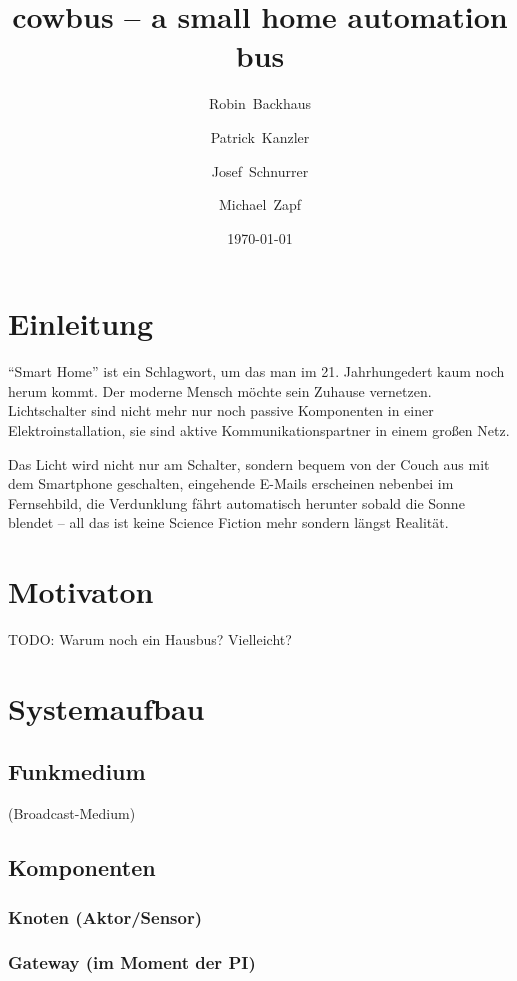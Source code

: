 \documentclass{IEEEtran}
\begin{document}
\title{cowbus -- a small home automation bus}
\author{Robin~Backhaus \and Patrick~Kanzler \and Josef~Schnurrer \and Michael~Zapf}
\date{\today}



\maketitle

\begin{abstract}
\end{abstract}


\section{Einleitung}
\enquote{Smart Home} ist ein Schlagwort, um das man im 21. Jahrhungedert
kaum noch herum kommt. Der moderne Mensch möchte sein Zuhause vernetzen.
Lichtschalter sind nicht mehr nur noch passive Komponenten in einer
Elektroinstallation, sie sind aktive Kommunikationspartner in einem großen Netz.

Das Licht wird nicht nur am Schalter, sondern bequem von der Couch aus mit dem
Smartphone geschalten, eingehende E-Mails erscheinen nebenbei im Fernsehbild,
die Verdunklung fährt automatisch herunter sobald die Sonne blendet --
all das ist keine Science Fiction mehr sondern längst Realität.

\section{Motivaton}
TODO: Warum noch ein Hausbus? Vielleicht?

\section{Systemaufbau}
    \subsection{Funkmedium}
        (Broadcast-Medium)

    \subsection{Komponenten}
        \subsubsection{Knoten (Aktor/Sensor)}
        \subsubsection{Gateway (im Moment der PI)}
    
\end{document}
